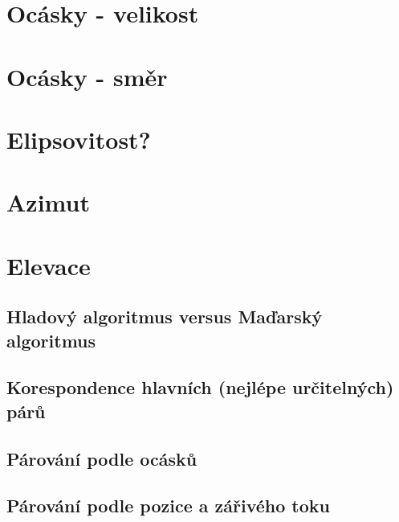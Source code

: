 \section*{Ocásky - velikost}

\section*{Ocásky - směr}

\section*{Elipsovitost?}

\section*{Azimut}

\section*{Elevace}








\subsection{Hladový algoritmus versus Maďarský algoritmus}


\subsection{Korespondence hlavních (nejlépe určitelných) párů}



\subsection{Párování podle ocásků}

\subsection{Párování podle pozice a zářivého toku }




